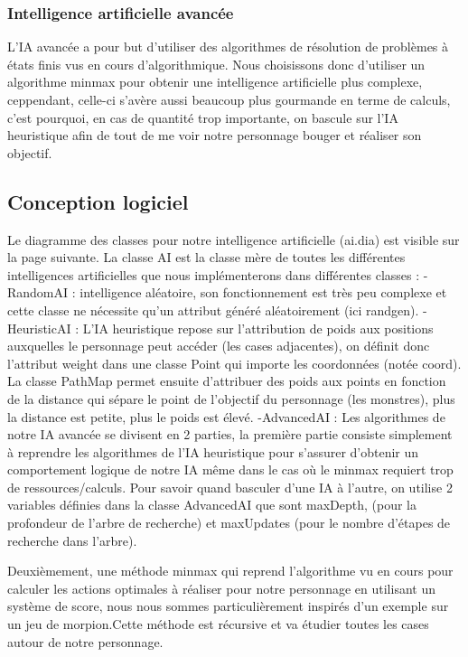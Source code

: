 \documentclass[a4paper,12pt]{article}
\begin{document}
\subsubsection{Intelligence artificielle avancée}

L'IA avancée a pour but d'utiliser des algorithmes de résolution de problèmes à états finis vus en cours d'algorithmique. Nous choisissons donc d'utiliser un algorithme minmax pour obtenir une intelligence artificielle plus complexe, ceppendant, celle-ci s'avère aussi beaucoup plus gourmande en terme de calculs, c'est pourquoi, en cas de quantité  trop importante, on bascule sur l'IA heuristique afin de tout de me voir notre personnage bouger et réaliser son objectif.

\clearpage
\subsection{Conception logiciel}

Le diagramme des classes pour notre intelligence artificielle (ai.dia) est visible sur la page suivante.
\bigbreak
La classe AI est la classe mère de toutes les différentes intelligences artificielles que nous implémenterons dans différentes classes :
\bigbreak
- RandomAI : intelligence aléatoire, son fonctionnement est très peu complexe et cette classe ne nécessite qu'un attribut généré aléatoirement (ici randgen).
\bigbreak
-HeuristicAI : L'IA heuristique repose sur l'attribution de poids aux positions auxquelles le personnage peut accéder (les cases adjacentes), on définit donc l'attribut weight dans une classe Point qui importe les coordonnées (notée coord). 
La classe PathMap permet ensuite d'attribuer des poids aux points en fonction de la distance qui sépare le point de l'objectif du personnage (les monstres), plus la distance est petite, plus le poids est élevé.
\bigbreak
-AdvancedAI : Les algorithmes de notre IA avancée se divisent en 2 parties, la première partie consiste simplement à reprendre les algorithmes de l'IA heuristique pour s'assurer d'obtenir un comportement logique de notre IA même dans le cas où le minmax requiert trop de ressources/calculs. Pour savoir quand basculer d'une IA à l'autre, on utilise 2 variables définies dans la classe AdvancedAI que sont maxDepth, (pour la profondeur de l'arbre de recherche) et maxUpdates (pour le nombre d'étapes de recherche dans l'arbre).

Deuxièmement, une méthode minmax qui reprend l'algorithme vu en cours pour calculer les actions optimales à réaliser pour notre personnage en utilisant un système de score, nous nous sommes particulièrement inspirés d'un exemple sur un jeu de morpion.Cette méthode est récursive et va étudier toutes les cases autour de notre personnage.
\end{document}
